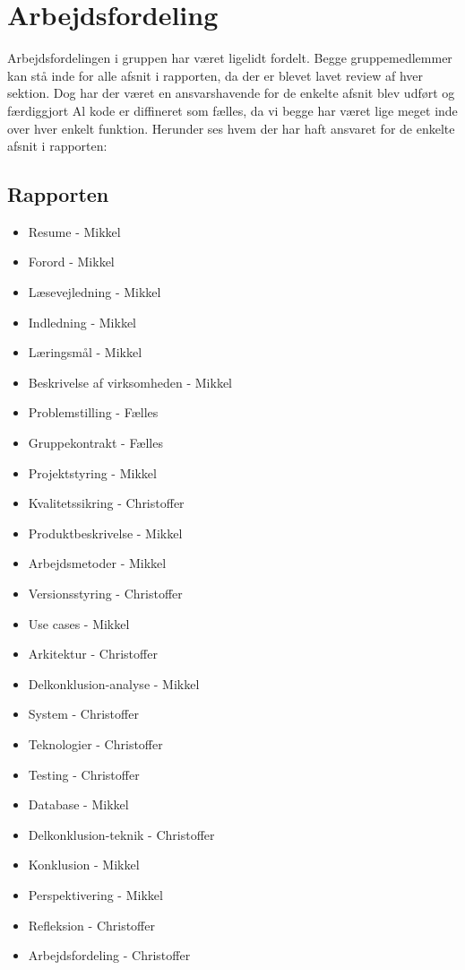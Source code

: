 \section{Arbejdsfordeling}
Arbejdsfordelingen i gruppen har været ligelidt fordelt. Begge gruppemedlemmer kan stå inde for alle afsnit i rapporten,
da der er blevet lavet review af hver sektion. 
Dog har der været en ansvarshavende for de enkelte afsnit blev udført og færdiggjort
Al kode er diffineret som fælles, da vi begge har været lige meget inde over hver enkelt funktion.
Herunder ses hvem der har haft ansvaret for de enkelte afsnit i rapporten:
\subsection{Rapporten}
\begin{itemize}
    \item{Resume - Mikkel}
    \item{Forord - Mikkel}
    \item{Læsevejledning - Mikkel}
    \item{Indledning - Mikkel}
    \item{Læringsmål - Mikkel}
    \item{Beskrivelse af virksomheden - Mikkel}
    \item{Problemstilling - Fælles}
    \item{Gruppekontrakt - Fælles}
    \item{Projektstyring - Mikkel}
    \item{Kvalitetssikring - Christoffer}
    \item{Produktbeskrivelse - Mikkel}
    \item{Arbejdsmetoder - Mikkel}
    \item{Versionsstyring - Christoffer}
    \item{Use cases - Mikkel}
    \item{Arkitektur - Christoffer}
    \item{Delkonklusion-analyse - Mikkel}
    \item{System - Christoffer}
    \item{Teknologier - Christoffer}
    \item{Testing - Christoffer}
    \item{Database - Mikkel}
    \item{Delkonklusion-teknik - Christoffer}
    \item{Konklusion - Mikkel}
    \item{Perspektivering - Mikkel}
    \item{Refleksion - Christoffer}
    \item{Arbejdsfordeling - Christoffer}
\end{itemize}
    
